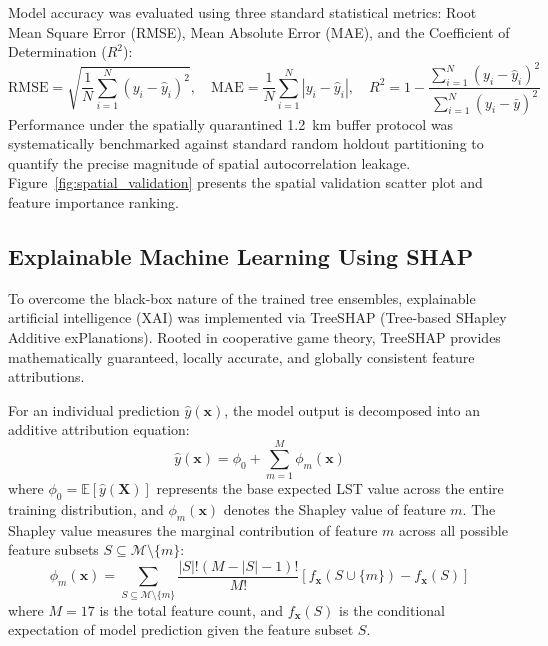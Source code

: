 \documentclass[a4paper,fleqn]{cas-sc}
\begin{document}
Model accuracy was evaluated using three standard statistical metrics: Root Mean Square Error (RMSE), Mean Absolute Error (MAE), and the Coefficient of Determination ($R^2$):
\begin{equation}
    \text{RMSE} = \sqrt{ \frac{1}{N} \sum_{i=1}^N (y_i - \hat{y}_i)^2 }, \quad \text{MAE} = \frac{1}{N} \sum_{i=1}^N |y_i - \hat{y}_i|, \quad R^2 = 1 - \frac{\sum_{i=1}^N (y_i - \hat{y}_i)^2}{\sum_{i=1}^N (y_i - \bar{y})^2}
    \label{eq:metrics}
\end{equation}
Performance under the spatially quarantined 1.2~km buffer protocol was systematically benchmarked against standard random holdout partitioning to quantify the precise magnitude of spatial autocorrelation leakage. Figure~\ref{fig:spatial_validation} presents the spatial validation scatter plot and feature importance ranking.

\subsection{Explainable Machine Learning Using SHAP}
\label{subsec:shap_explainability}

To overcome the black-box nature of the trained tree ensembles, explainable artificial intelligence (XAI) was implemented via TreeSHAP (Tree-based SHapley Additive exPlanations). Rooted in cooperative game theory, TreeSHAP provides mathematically guaranteed, locally accurate, and globally consistent feature attributions.

For an individual prediction $\hat{y}(\mathbf{x})$, the model output is decomposed into an additive attribution equation:
\begin{equation}
    \hat{y}(\mathbf{x}) = \phi_0 + \sum_{m=1}^M \phi_m(\mathbf{x})
    \label{eq:shap_additive}
\end{equation}
where $\phi_0 = \mathbb{E}[\hat{y}(\mathbf{X})]$ represents the base expected LST value across the entire training distribution, and $\phi_m(\mathbf{x})$ denotes the Shapley value of feature $m$. The Shapley value measures the marginal contribution of feature $m$ across all possible feature subsets $S \subseteq \mathcal{M} \setminus \{m\}$:
\begin{equation}
    \phi_m(\mathbf{x}) = \sum_{S \subseteq \mathcal{M} \setminus \{m\}} \frac{|S|! (M - |S| - 1)!}{M!} \left[ f_{\mathbf{x}}(S \cup \{m\}) - f_{\mathbf{x}}(S) \right]
    \label{eq:shapley_def}
\end{equation}
where $M = 17$ is the total feature count, and $f_{\mathbf{x}}(S)$ is the conditional expectation of model prediction given the feature subset $S$.
\end{document}
